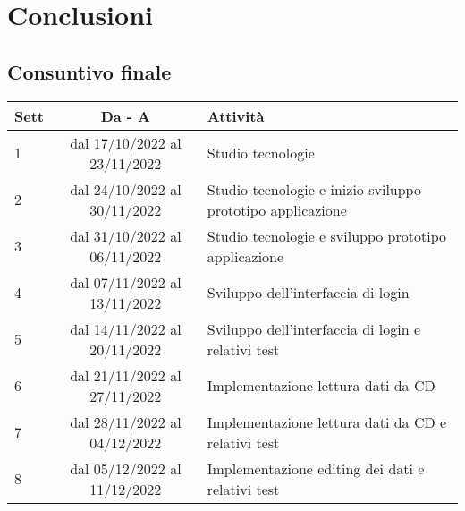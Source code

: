 
\chapter{Conclusioni}
\label{cap:conclusioni}
\section{Consuntivo finale}
\label{sec:consuntivo-finale}

\renewcommand{\arraystretch}{1.8} %
\begin{table}[H]%
  \begin{tabularx}{\textwidth}{|l|c|X|}
    \hline
    {\textbf{Sett}} & {\textbf{Da - A}}            & \textbf{Attività}                                                                         \\
    \hline
    1               & dal 17/10/2022 al 23/11/2022 & Studio tecnologie                                                                         \\
    \hline
    2               & dal 24/10/2022 al 30/11/2022 & Studio tecnologie e inizio sviluppo prototipo applicazione                                \\
    \hline
    3               & dal 31/10/2022 al 06/11/2022 & Studio tecnologie e sviluppo prototipo applicazione                                       \\
    \hline
    4               & dal 07/11/2022 al 13/11/2022 & Sviluppo dell'interfaccia di login                                                        \\
    \hline
    5               & dal 14/11/2022 al 20/11/2022 & Sviluppo dell'interfaccia di login e relativi test                                        \\
    \hline
    6               & dal 21/11/2022 al 27/11/2022 & Implementazione lettura dati da CD                                                        \\
    \hline
    7               & dal 28/11/2022 al 04/12/2022 & Implementazione lettura dati da CD e relativi test                                        \\
    \hline
    8               & dal 05/12/2022 al 11/12/2022 & Implementazione editing dei dati e relativi test                                          \\

\end{tabularx}
\end{table}
